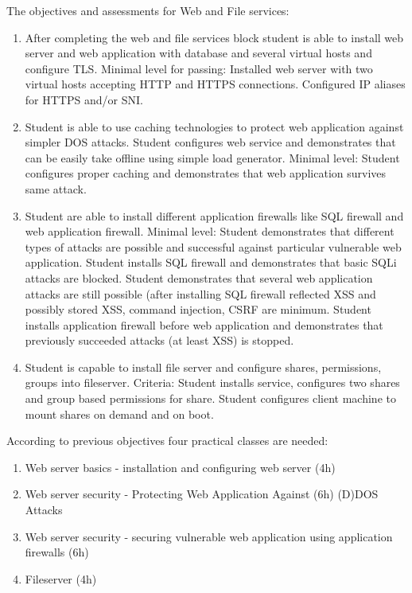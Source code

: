 The objectives and assessments for Web and File services:
\begin{enumerate}
\item After completing the web and file services block student is able to install web server and web application with database and several virtual hosts and configure \gls{TLS}. Minimal level for passing: Installed web server with two virtual hosts accepting \gls{HTTP} and \gls{HTTPS} connections. Configured IP aliases for \gls{HTTPS} and/or \gls{SNI}.
\item Student is able to use caching technologies to protect web application against simpler \gls{DOS} attacks. Student configures web service and demonstrates that can be easily take offline using simple load generator. Minimal level: Student configures proper caching and demonstrates that web application survives same attack.
\item Student are able to install different application firewalls like \gls{SQL} firewall and web application firewall. Minimal level: Student demonstrates that different types of attacks are possible and successful against particular vulnerable web application. Student installs \gls{SQL} firewall and demonstrates that basic \gls{SQLi} attacks are blocked. Student demonstrates that several web application attacks are still possible (after installing \gls{SQL} firewall reflected \gls{XSS} and possibly stored \gls{XSS}, command injection, \gls{CSRF} are minimum. Student installs application firewall before web application and demonstrates that previously succeeded attacks (at least \gls{XSS}) is stopped.
\item Student is capable to install file server and configure shares, permissions, groups into fileserver. Criteria: Student installs service, configures two shares and group based permissions for share. Student configures client machine to mount shares on demand and on boot.
\end{enumerate}


According to previous objectives four practical classes are needed:
\begin{enumerate}[label=LAB \arabic*.,leftmargin=*]
   \item Web server basics - installation and configuring web server (4h)
  	\item Web server security - Protecting Web Application Against (6h)
(D)DOS Attacks
  	\item Web server security - securing vulnerable web application using application firewalls (6h)
  	\item Fileserver (4h)
\end{enumerate}


